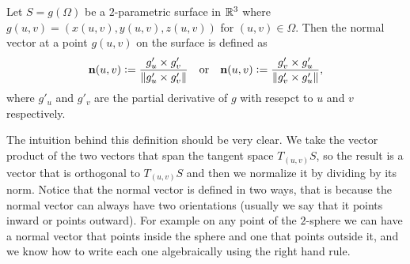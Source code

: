 \documentclass[11pt,a4paper]{article}
\begin{document}
\begin{definition}
  Let $S = g(\Omega)$ be a $2$-parametric surface in $\mathbb{R}^3$
  where $g(u,v) = (x(u,v),y(u,v),z(u,v))$ for $(u,v) \in \Omega$.
  Then the normal vector at a point $g(u,v)$ on the surface is defined as
  \[
    \boldsymbol{\mathbf{n}}(u,v) := \frac{g'_u \times g'_v}{\left\lVert g'_u \times g'_v\right\rVert} \quad \text{or} \quad
    \boldsymbol{\mathbf{n}}(u,v) := \frac{g'_v \times g'_u}{\left\lVert g'_v \times g'_u\right\rVert},
  \]
  where $g'_u$ and $g'_v$ are the partial derivative of $g$
  with resepct to $u$ and $v$ respectively.
\end{definition}
\begin{remark}
  The intuition behind this definition should be very clear.
  We take the vector product of the two vectors that span the tangent
  space $T_{(u,v)}S$, so the result is a vector that is orthogonal
  to $T_{(u,v)}S$ and then we normalize it by dividing by its norm.
  Notice that the normal vector is defined in two ways,
  that is because the normal vector can always have two orientations
  (usually we say that it points inward or points outward).
  For example on any point of the $2$-sphere we can have a normal
  vector that points inside the sphere and one that points outside it,
  and we know how to write each one algebraically using the right hand rule.
\end{remark}
\end{document}
